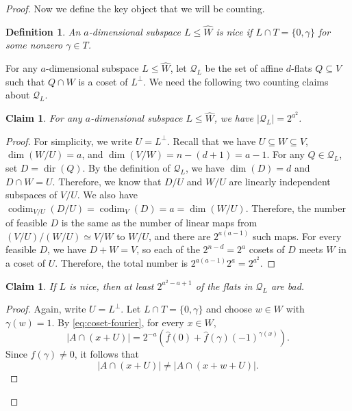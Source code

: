 \documentclass[10pt,a4paper]{amsart}
\newtheorem{claim}[theorem]{Claim}
\newtheorem{definition}[theorem]{Definition}
\newcommand{\cQ}{\mathcal Q}
\DeclareMathOperator{\dir}{dir}
\DeclareMathOperator{\codim}{codim}
\begin{document}
\begin{proof}
Now we define the key object that we will be counting.

\begin{definition}
An $a$-dimensional subspace $L\le\widehat W$ is \emph{nice} if $L\cap T=\{0,\gamma\}$ for some nonzero $\gamma\in T$.
\end{definition}

For any $a$-dimensional subspace $L\le\widehat W$, let $\cQ_L$ be the set of affine $d$-flats $Q\subseteq V$ such that $Q\cap W$ is a coset of $L^\perp$. We need the following two counting claims about $\cQ_L$.

\begin{claim}\label{claim:extensions}
For any $a$-dimensional subspace $L\le\widehat W$, we have $|\cQ_L|=2^{a^2}$.
\end{claim}

\begin{proof}
For simplicity, we write $U=L^\perp$. Recall that we have $U\subseteq W\subseteq V$,  $\dim(W/U)=a$, and $\dim(V/W)=n-(d+1)=a-1$. For any $Q\in\cQ_L$, set $D=\dir(Q)$. By the definition of $\cQ_L$, we have $\dim(D)=d$ and $D\cap W=U$. Therefore, we know that $D/U$ and $W/U$ are linearly independent subspaces of $V/U$. We also have $\codim_{V/U}(D/U)=\codim_V(D)=a=\dim(W/U)$. Therefore, the number of feasible $D$ is the same as the number of linear maps from $(V/U)/(W/U)\simeq V/W$ to $W/U$, and there are $2^{a(a-1)}$ such maps. For every feasible $D$,
we have $D+W=V$, so each of the $2^{n-d}=2^a$ cosets of $D$ meets $W$
in a coset of $U$. Therefore, the total number is $2^{a(a-1)}2^a=2^{a^2}$.
\end{proof}

\begin{claim}\label{claim:forced-bad}
If $L$ is nice, then at least
$2^{a^2-a+1}$ of the flats in $\cQ_L$ are bad.
\end{claim}


\begin{proof}
Again, write $U=L^\perp$. Let $L\cap T=\{0,\gamma\}$ and choose $w\in W$ with
$\gamma(w)=1$.  By \eqref{eq:coset-fourier}, for every $x\in W$,
\[
  |A\cap(x+U)|
  =2^{-a}\left(\widehat f(0)
      +\widehat f(\gamma)(-1)^{\gamma(x)}\right).
\]
Since $\widehat f(\gamma)\ne0$, it follows that
\begin{equation}\label{eq:unequal-cosets}
  |A\cap(x+U)|\ne|A\cap(x+w+U)|.
\end{equation}


\end{proof}
\end{proof}
\end{document}
